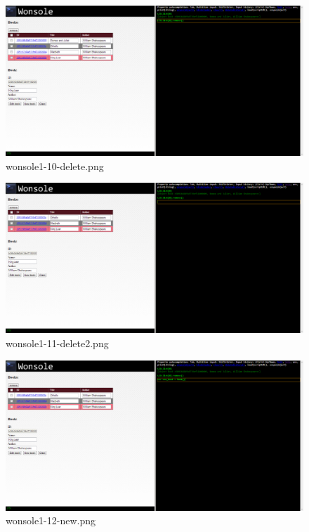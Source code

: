 \begin{figure}
\includegraphics[width=\textwidth]{screenshot/wonsole1-10-delete.png}
\caption{wonsole1-10-delete.png}
\label{wonsole1-10-delete.png}
\end{figure}


\clearpage
\begin{figure}
\includegraphics[width=\textwidth]{screenshot/wonsole1-11-delete2.png}
\caption{wonsole1-11-delete2.png}
\label{wonsole1-11-delete2.png}
\end{figure}


\begin{figure}
\includegraphics[width=\textwidth]{screenshot/wonsole1-12-new.png}
\caption{wonsole1-12-new.png}
\label{wonsole1-12-new.png}
\end{figure}


